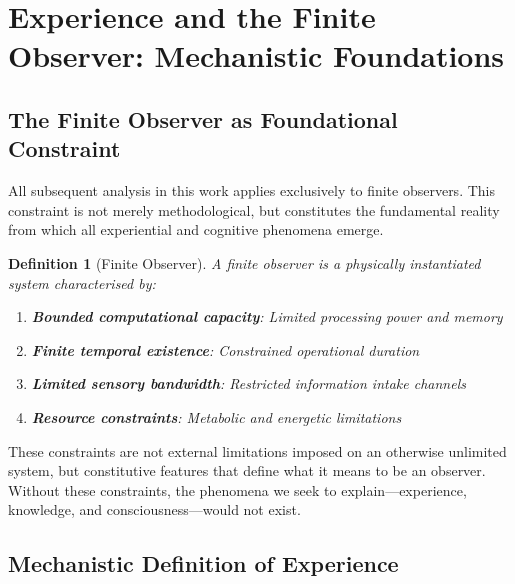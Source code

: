 \documentclass{article}
\newtheorem{definition}[theorem]{Definition}
\begin{document}
\begin{abstract}
This theoretical framework provides complete mechanistic coverage of experiential processes from physical foundations through termination endpoints while maintaining mathematical rigour and thermodynamic consistency, establishing experience as finite, meaningful, and naturally self-completing phenomena that achieve ultimate purpose through successful optimization completion.
\end{abstract}

\tableofcontents

\section{Experience and the Finite Observer: Mechanistic Foundations}

\subsection{The Finite Observer as Foundational Constraint}

All subsequent analysis in this work applies exclusively to finite observers. This constraint is not merely methodological, but constitutes the fundamental reality from which all experiential and cognitive phenomena emerge.

\begin{definition}[Finite Observer]
A finite observer is a physically instantiated system characterised by:
\begin{enumerate}
\item \textbf{Bounded computational capacity}: Limited processing power and memory
\item \textbf{Finite temporal existence}: Constrained operational duration
\item \textbf{Limited sensory bandwidth}: Restricted information intake channels
\item \textbf{Resource constraints}: Metabolic and energetic limitations
\end{enumerate}
\end{definition}

These constraints are not external limitations imposed on an otherwise unlimited system, but constitutive features that define what it means to be an observer. Without these constraints, the phenomena we seek to explain—experience, knowledge, and consciousness—would not exist.

\subsection{Mechanistic Definition of Experience}
\end{document}
